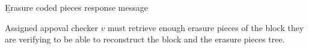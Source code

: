 {{\begin{definition}
  \label{defn-erasure-coded-pieces-response}
        {\b Erasure coded pieces response message} \TBS
\end{definition}

Assigned appoval checker $v$ must retrieve enough erasure pieces of the block they are verifying to be able to reconstruct the block and the erasure pieces tree.







}}
